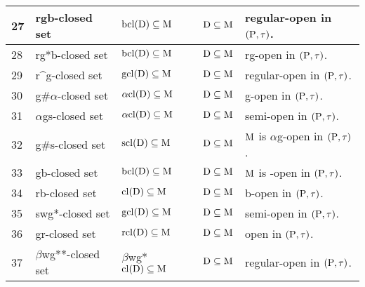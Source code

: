 {\begin{longtable}{@{}|p{.9cm}|>{\raggedright}p{5cm}|>{\centering}p{2.5cm}|>{\centering}p{1.7cm}|>{\centering}p{2.8cm}|@{}}
\hline
27 & rgb-closed set \cite{Mariappa} & $\mathrm{bcl}(\mathrm{D}) \subseteq \mathrm{M}$ & $\mathrm{D} \subseteq \mathrm{M}$ & regular-open in $(\mathrm{P}, \tau)$.\tabularnewline
\hline
28 & rg*b-closed set \cite{Indirani} & $\mathrm{bcl}(\mathrm{D}) \subseteq \mathrm{M}$ & $\mathrm{D} \subseteq \mathrm{M}$ & rg-open in $(\mathrm{P}, \tau)$.\tabularnewline
\hline
29 & r\textasciicircum{g}-closed set \cite{Janaki2} & $\mathrm{gcl}(\mathrm{D}) \subseteq \mathrm{M}$ & $\mathrm{D} \subseteq \mathrm{M}$ & regular-open in $(\mathrm{P}, \tau)$.\tabularnewline
\hline
30 & g\#$\alpha$-closed set \cite{Devi} & $\alpha\mathrm{cl}(\mathrm{D}) \subseteq \mathrm{M}$ & $\mathrm{D}\subseteq\mathrm{M}$ & g-open in $(\mathrm{P}, \tau)$.\tabularnewline
\hline
31 & $\alpha$gs-closed set \cite{Rajamani} & $\alpha\mathrm{cl}(\mathrm{D}) \subseteq \mathrm{M}$ & $\mathrm{D} \subseteq \mathrm{M}$ & semi-open in $(\mathrm{P}, \tau)$.\tabularnewline
\hline
32 & g\#s-closed set \cite{VeeraKumar1} & $\mathrm{scl}(\mathrm{D}) \subseteq \mathrm{M}$ & $\mathrm{D} \subseteq \mathrm{M}$ & $\mathrm{M}$ is $\alpha$g-open in $(\mathrm{P}, \tau)$.\tabularnewline
\hline
33 & gb-closed set \cite{Ahmad} & $\mathrm{bcl}(\mathrm{D}) \subseteq \mathrm{M}$ & $\mathrm{D} \subseteq \mathrm{M}$ & $\mathrm{M}$ is -open in $(\mathrm{P}, \tau)$.\tabularnewline
\hline
34 & rb-closed set \cite{Nagaveni2} & $\mathrm{cl}(\mathrm{D}) \subseteq \mathrm{M}$ & $\mathrm{D} \subseteq \mathrm{M}$ & b-open in $(\mathrm{P}, \tau)$.\tabularnewline
\hline
35 & swg*-closed set \cite{Nagaveni} & $\mathrm{gcl}(\mathrm{D}) \subseteq \mathrm{M}$ & $\mathrm{D} \subseteq \mathrm{M}$ & semi-open in $(\mathrm{P}, \tau)$.\tabularnewline
\hline
36 & gr-closed set \cite{Bhattacharya1} & $\mathrm{rcl}(\mathrm{D}) \subseteq \mathrm{M}$ & $\mathrm{D} \subseteq \mathrm{M}$ & open in $(\mathrm{P}, \tau)$.\tabularnewline
\hline
37 & $\beta$wg{*}{*}-closed set \cite{Subashini} & $\beta$wg*$\mathrm{cl}(\mathrm{D}) \subseteq \mathrm{M}$ & $\mathrm{D} \subseteq \mathrm{M}$ & regular-open in $(\mathrm{P}, \tau)$.\tabularnewline
\hline

\end{longtable}}
